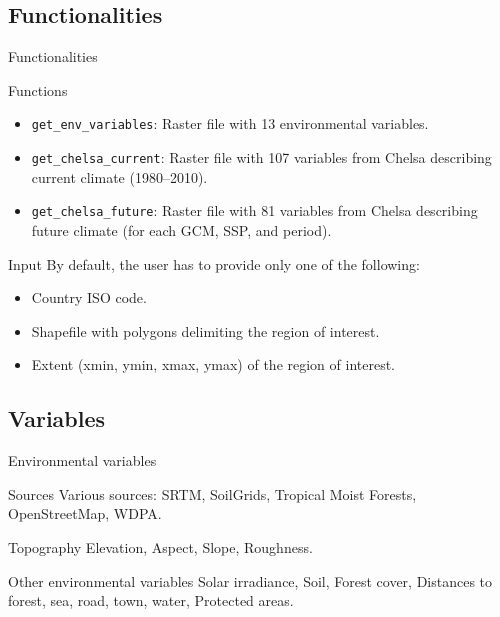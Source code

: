\documentclass[10pt,table,dvipsnames,compress]{beamer}
\begin{document}
\subsection{Functionalities}
\label{sec:orgc7790f8}

\begin{frame}[label={sec:orgc522286},fragile]{Functionalities}
 \begin{block}{Functions}
\begin{itemize}
\item \texttt{get\_env\_variables}: Raster file with 13 environmental variables.
\item \texttt{get\_chelsa\_current}: Raster file with 107 variables from Chelsa describing current climate (1980--2010).
\item \texttt{get\_chelsa\_future}: Raster file with 81 variables from Chelsa describing future climate (for each GCM, SSP, and period).
\end{itemize}
\end{block}

\begin{block}{Input}
By default, the user has to provide only one of the following:
\begin{itemize}
\item Country ISO code.
\item Shapefile with polygons delimiting the region of interest.
\item Extent (xmin, ymin, xmax, ymax) of the region of interest.
\end{itemize}
\end{block}
\end{frame}

\subsection{Variables}
\label{sec:org21bac8f}

\begin{frame}[label={sec:orgeef76fc}]{Environmental variables}
\begin{block}{Sources}
Various sources: SRTM, SoilGrids, Tropical Moist Forests, OpenStreetMap, WDPA. 
\end{block}

\begin{block}{Topography}
Elevation, Aspect, Slope, Roughness.
\end{block}

\begin{block}{Other environmental variables}
Solar irradiance, Soil, Forest cover, Distances to forest, sea, road, town, water, Protected areas.
\end{block}
\end{frame}
\end{document}

